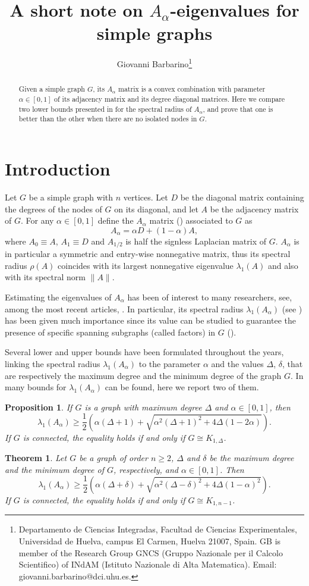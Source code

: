 \documentclass[a4paper,10pt]{article}
\title{A short note on $A_\alpha$-eigenvalues for simple graphs}
\date{}
\author{Giovanni Barbarino\thanks{Departamento de Ciencias Integradas, Facultad de Ciencias Experimentales, Universidad de Huelva, campus El Carmen, Huelva 21007, Spain.  GB is member of the Research Group GNCS (Gruppo Nazionale per il
Calcolo Scientifico) of INdAM (Istituto Nazionale di Alta Matematica). 
Email: giovanni.barbarino@dci.uhu.es. } }
\theoremstyle{definition}
\theoremstyle{plain}
\newtheorem{theorem}{Theorem}
\newtheorem{proposition}{Proposition}
\begin{document}
\maketitle
\begin{abstract}
  Given a simple graph $G$, its $A_\alpha$ matrix is a convex combination with parameter $\alpha\in [0,1]$ of its adjacency matrix and its degree diagonal matrices.  Here we compare two lower bounds presented in \cite{1} for the spectral radius of $A_\alpha$, and prove that one is better than the other when there are no isolated nodes in $G$. 
\end{abstract}

\section{Introduction}

Let $G$ be a simple graph with $n$ vertices. Let $D$ be the diagonal matrix containing the degrees of the nodes of $G$ on its diagonal, and let $A$ be the adjacency matrix of $G$. For any  $\alpha\in [0,1]$ define the $A_\alpha$ matrix (\cite{2}) associated to $G$ as
\[
A_\alpha = \alpha D + (1-\alpha) A,
\]
where $A_0\equiv A$, $A_1\equiv D$ and $A_{1/2}$ is half the signless Laplacian matrix of $G$. $A_\alpha$ is in particular a symmetric and entry-wise nonnegative matrix, thus its spectral radius $\rho(A)$ coincides with its largest nonnegative eigenvalue $\lambda_1(A)$ and also with its spectral norm $\|A\|$. 

Estimating the eigenvalues of $A_\alpha$ has been of interest to many researchers, see, among the most recent articles, \cite{3,4}. In particular,  its spectral radius $\lambda_1(A_\alpha)$  (see \cite{5})  has been given much importance since its value can be studied to guarantee the presence of specific spanning subgraphs (called factors) in $G$ (\cite{8,7,6}).


Several lower and upper bounds have been formulated throughout the years, linking the spectral radius $\lambda_1(A_\alpha)$ to the parameter $\alpha$ and the values $\Delta$, $\delta$, that are respectively  the maximum degree and the minimum degree of the graph $G$.  
In \cite{2,1,3} many bounds for $\lambda_1(A_\alpha)$ can be found, here we report two of them.


\begin{proposition}
\cite{2}   \label{bound1} If $G$ is a graph with maximum degree $\Delta$ and  $\alpha\in [0,1]$, then 
    \[
    \lambda_1(A_\alpha) \ge \frac 12 \left( \alpha(\Delta+1)+\sqrt{\alpha^2(\Delta+1)^2 + 4\Delta(1-2\alpha)}  \right).
    \]
        If $G$ is connected, the equality holds if and only if $G\cong K_{1,\Delta}$.
\end{proposition}
\begin{theorem}
    \cite{1} \label{bound2} Let $G$ be a graph of order $n\ge 2$, $\Delta$ and $\delta$ be the maximum degree and the minimum degree of $G$, respectively, and $\alpha\in [0,1]$. Then 
       \[
    \lambda_1(A_\alpha) \ge \frac 12 \left( \alpha(\Delta+\delta)+\sqrt{\alpha^2(\Delta-\delta)^2 + 4\Delta(1-\alpha)^2}  \right).
    \]
    If $G$ is connected, the equality holds if and only if $G\cong K_{1,n-1}$.
\end{theorem}
\end{document}
